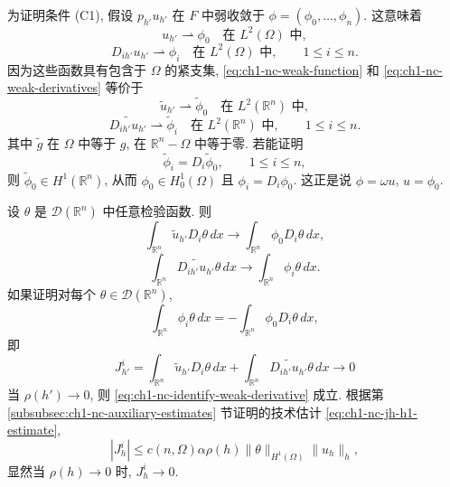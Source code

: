 \begin{Proof}
为证明条件 (C1), 假设 $p_{h'}u_{h'}$ 在 $F$ 中弱收敛于 $\phi=(\phi_0,\ldots,\phi_n)$. 这意味着
\begin{equation}
u_{h'}\rightharpoonup\phi_0
\quad\text{在 }L^2(\Omega)\text{ 中},
\label{eq:ch1-nc-weak-function}
\end{equation}
\begin{equation}
D_{ih'}u_{h'}\rightharpoonup\phi_i
\quad\text{在 }L^2(\Omega)\text{ 中},
\qquad1\leq i\leq n.
\label{eq:ch1-nc-weak-derivatives}
\end{equation}
因为这些函数具有包含于 $\Omega$ 的紧支集, \eqref{eq:ch1-nc-weak-function} 和 \eqref{eq:ch1-nc-weak-derivatives} 等价于
\begin{equation}
\widetilde u_{h'}\rightharpoonup\widetilde\phi_0
\quad\text{在 }L^2(\mathbb R^n)\text{ 中},
\label{eq:ch1-nc-extended-weak-function}
\end{equation}
\begin{equation}
\widetilde{D_{ih'}u_{h'}}\rightharpoonup\widetilde\phi_i
\quad\text{在 }L^2(\mathbb R^n)\text{ 中},
\qquad1\leq i\leq n.
\label{eq:ch1-nc-extended-weak-derivatives}
\end{equation}
其中 $\widetilde g$ 在 $\Omega$ 中等于 $g$, 在 $\mathbb R^n-\Omega$ 中等于零. 若能证明
\begin{equation}
\widetilde\phi_i=D_i\widetilde\phi_0,
\qquad1\leq i\leq n,
\label{eq:ch1-nc-identify-weak-derivative}
\end{equation}
则 $\widetilde\phi_0\in H^1(\mathbb R^n)$, 从而 $\phi_0\in H_0^1(\Omega)$ 且 $\phi_i=D_i\phi_0$. 这正是说 $\phi=\omega u$, $u=\phi_0$.

设 $\theta$ 是 $\mathcal D(\mathbb R^n)$ 中任意检验函数. 则
\[
\int_{\mathbb R^n}\widetilde u_{h'}D_i\theta\,dx
\longrightarrow\int_{\mathbb R^n}\phi_0D_i\theta\,dx,
\]
\[
\int_{\mathbb R^n}\widetilde{D_{ih'}u_{h'}}\theta\,dx
\longrightarrow\int_{\mathbb R^n}\phi_i\theta\,dx.
\]
如果证明对每个 $\theta\in\mathcal D(\mathbb R^n)$,
\[
\int_{\mathbb R^n}\phi_i\theta\,dx
=-\int_{\mathbb R^n}\phi_0D_i\theta\,dx,
\]
即
\[
J_{h'}^i=\int_{\mathbb R^n}\widetilde u_{h'}D_i\theta\,dx
+\int_{\mathbb R^n}\widetilde{D_{ih'}u_{h'}}\theta\,dx
\longrightarrow0
\]
当 $\rho(h')\to0$, 则 \eqref{eq:ch1-nc-identify-weak-derivative} 成立. 根据第 \ref{subsubsec:ch1-nc-auxiliary-estimates} 节证明的技术估计 \eqref{eq:ch1-nc-jh-h1-estimate},
\begin{equation}
|J_h^i|\leq c(n,\Omega)\alpha\rho(h)
\|\theta\|_{H^1(\Omega)}\|u_h\|_h,
\label{eq:ch1-nc-jh-weak-estimate}
\end{equation}
显然当 $\rho(h)\to0$ 时, $J_h^i\to0$.
\end{Proof}

